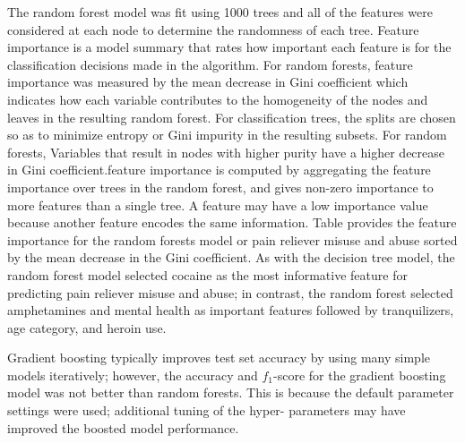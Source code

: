 \documentclass[sigconf]{acmart}
\begin{document}
The random forest model was fit using 1000 trees and all of the features 
were considered at each node to determine the randomness of each tree.
Feature importance is a model summary that rates how important each feature is 
for the classification decisions made in the algorithm. For random forests, 
feature importance was measured by the mean decrease in Gini coefficient 
which indicates how each variable contributes to the homogeneity of the nodes 
and leaves in the resulting random forest. For classification trees, the splits 
are chosen so as to minimize entropy or Gini impurity in the resulting subsets.
For random forests, Variables that result in nodes with higher purity have a 
higher decrease in Gini coefficient.feature importance is computed by 
aggregating the feature importance over trees in the random forest, and gives 
non-zero importance to more features than a single tree.  A feature may have 
a low importance value because another feature encodes the same information. 
Table  provides the feature importance for the random forests model or pain 
reliever misuse and abuse sorted by the mean decrease in the Gini coefficient. 
As with the decision tree model, the random forest model selected cocaine as
the most informative feature for predicting pain reliever misuse and abuse; 
in contrast, the random forest selected amphetamines and mental health as
important features followed by tranquilizers, age category, and heroin use. 

Gradient boosting typically improves test set accuracy by using many simple
models iteratively; however, the accuracy and $f_1$-score for the gradient 
boosting model was not better than random forests. This is because the 
default parameter settings were used; additional tuning of the hyper-
parameters may have improved the boosted model performance.

\end{document}

